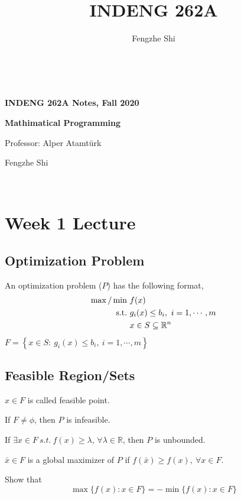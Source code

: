 \documentclass[11pt]{article}
\numberwithin{equation}{section}
\begin{document}
\title{INDENG 262A}
\author{Fengzhe Shi}
\thispagestyle{empty}
$ $
\vfill
\begin{center}

\centerline{\huge \textbf{INDENG 262A Notes, Fall 2020}}
\centerline{\Large \textbf{Mathimatical Programming} } 
\centerline{Professor: Alper Atamt\"{u}rk}
\centerline{Fengzhe Shi}
\end{center}
\vfill
$ $
\newpage
\thispagestyle{empty}
\tableofcontents
\newpage
\section{Week 1 Lecture}
\subsection{Optimization Problem}
An optimization problem ($P$) has the following format,
\begin{align*}
    \max /\min\ &f(x)\\
    \text{s.t.} \ &g_i(x)\leq b_i, \ i=1,\cdots,m\\
    & x\in S \subseteq \mathbb{R}^n \\
\end{align*}
$F= \left\{ x\in S:\ g_i(x)\leq b_i, \ i=1,\cdots,m \right\} $

\subsection{Feasible Region/Sets}
$x\in F$ is called feasible point.
\begin{definition}
    If $F\neq \phi$, then $P$ is infeasible.
\end{definition}
\begin{definition}
    If $\exists x \in F \ s.t.\ f(x)\geq \lambda$, $\forall \lambda \in \mathbb{R}$, then $P$ is unbounded.
\end{definition}
\begin{definition}
    $\bar{x}\in F$ is a global maximizer of $P$ if $f(\bar{x})\geq f(x), \ \forall x \in F$.
\end{definition}

\begin{example}
    Show that $$\max \{ f(x):x \in F \}=-\min \{ f(x):x\in F \}$$
\end{example}
\end{document}
